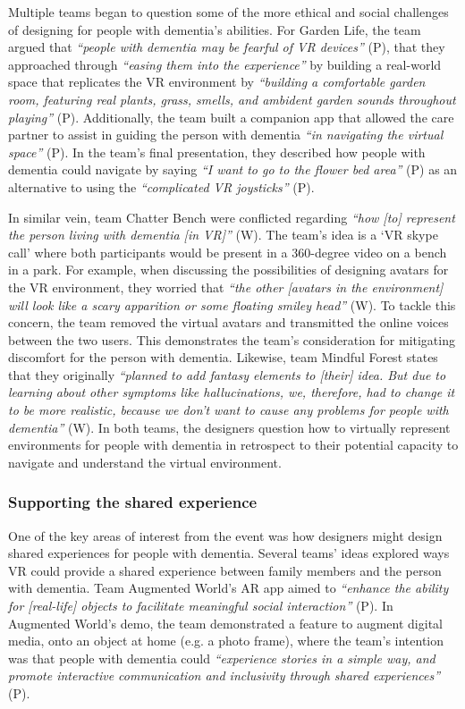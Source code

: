 Multiple teams began to question some of the more ethical and social challenges of designing for people with dementia’s abilities. For Garden Life, the team argued that \textit{``people with dementia may be fearful of VR devices''} (P), that they approached through \textit{``easing them into the experience''} by building a real-world space that replicates the VR environment by \textit{``building a comfortable garden room, featuring real plants, grass, smells, and ambident garden sounds throughout playing''} (P). Additionally, the team built a companion app that allowed the care partner to assist in guiding the person with dementia \textit{``in navigating the virtual space''} (P). In the team’s final presentation, they described how people with dementia could navigate by saying \textit{``I want to go to the flower bed area''} (P) as an alternative to using the \textit{``complicated VR joysticks''} (P). 

In similar vein, team Chatter Bench were conflicted regarding \textit{``how [to] represent the person living with dementia [in VR]''} (W). The team's idea is a `VR skype call' where both participants would be present in a 360-degree video on a bench in a park. For example, when discussing the possibilities of designing avatars for the VR environment, they worried that \textit{``the other [avatars in the environment] will look like a scary apparition or some floating smiley head''} (W). To tackle this concern, the team removed the virtual avatars and transmitted the online voices between the two users. This demonstrates the team’s consideration for mitigating discomfort for the person with dementia. Likewise, team Mindful Forest states that they originally \textit{``planned to add fantasy elements to [their] idea. But due to learning about other symptoms like hallucinations, we, therefore, had to change it to be more realistic, because we don't want to cause any problems for people with dementia''} (W). In both teams, the designers question how to virtually represent environments for people with dementia in retrospect to their potential capacity to navigate and understand the virtual environment. 

\subsubsection{Supporting the shared experience}
\label{ThemeThree:Subthemetwo}
One of the key areas of interest from the event was how designers might design shared experiences for people with dementia. Several teams’ ideas explored ways VR could provide a shared experience between family members and the person with dementia. Team Augmented World’s AR app aimed to \textit{``enhance the ability for [real-life] objects to facilitate meaningful social interaction''} (P). In Augmented World's demo, the team demonstrated a feature to augment digital media, onto an object at home (e.g. a photo frame), where the team’s intention was that people with dementia could \textit{``experience stories in a simple way, and promote interactive communication and inclusivity through shared experiences''} (P).

